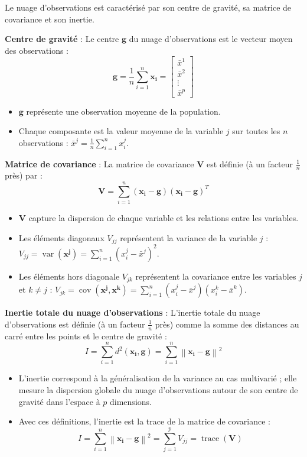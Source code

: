 \documentclass[10pt,a4paper]{article}
\begin{document}
Le nuage d'observations est caractérisé par son centre de gravité, sa matrice de covariance et son inertie.

\textbf{Centre de gravité} :
Le centre $\mathbf{g}$ du nuage d'observations est le vecteur moyen des observations :
$$\mathbf{g}=\frac{1}{n} \sum_{i=1}^{n} \mathbf{x}_{\mathbf{i}}=\left[\begin{array}{c}
\bar{x}^{1} \\
\bar{x}^{2} \\
\vdots \\
\bar{x}^{p}
\end{array}\right]$$
\begin{itemize}
    \item $\mathbf{g}$ représente une observation moyenne de la population.
    \item Chaque composante est la valeur moyenne de la variable $j$ sur toutes les $n$ observations : $\bar{x}^{j}=\frac{1}{n} \sum_{i=1}^{n} x_{i}^{j}$.
\end{itemize}

\textbf{Matrice de covariance} :
La matrice de covariance $\mathbf{V}$ est définie (à un facteur $\frac{1}{n}$ près) par :
$$\mathbf{V}=\sum_{i=1}^{n}\left(\mathbf{x}_{\mathbf{i}}-\mathbf{g}\right)\left(\mathbf{x}_{\mathbf{i}}-\mathbf{g}\right)^{T}$$
\begin{itemize}
    \item $\mathbf{V}$ capture la dispersion de chaque variable et les relations entre les variables.
    \item Les éléments diagonaux $V_{jj}$ représentent la variance de la variable $j$ : $V_{jj}=\operatorname{var}\left(\mathbf{x}^{\mathbf{j}}\right)=\sum_{i=1}^{n}\left(x_{i}^{j}-\bar{x}^{j}\right)^{2}$.
    \item Les éléments hors diagonale $V_{jk}$ représentent la covariance entre les variables $j$ et $k \neq j$ : $V_{jk}=\operatorname{cov}\left(\mathbf{x}^{\mathbf{j}}, \mathbf{x}^{\mathbf{k}}\right)=\sum_{i=1}^{n}\left(x_{i}^{j}-\bar{x}^{j}\right)\left(x_{i}^{k}-\bar{x}^{k}\right)$.
\end{itemize}

\textbf{Inertie totale du nuage d'observations} :
L'inertie totale du nuage d'observations est définie (à un facteur $\frac{1}{n}$ près) comme la somme des distances au carré entre les points et le centre de gravité :
$$I=\sum_{i=1}^{n} d^{2}\left(\mathbf{x}_{\mathbf{i}}, \mathbf{g}\right)=\sum_{i=1}^{n}\left\|\mathbf{x}_{\mathbf{i}}-\mathbf{g}\right\|^{2}$$
\begin{itemize}
    \item L'inertie correspond à la généralisation de la variance au cas multivarié ; elle mesure la dispersion globale du nuage d'observations autour de son centre de gravité dans l'espace à $p$ dimensions.
    \item Avec ces définitions, l'inertie est la trace de la matrice de covariance :
    $$I = \sum_{i=1}^{n}\left\|\mathbf{x}_{\mathbf{i}}-\mathbf{g}\right\|^{2} = \sum_{j=1}^{p} V_{jj} = \operatorname{trace}(\mathbf{V})$$
\end{itemize}
\end{document}
